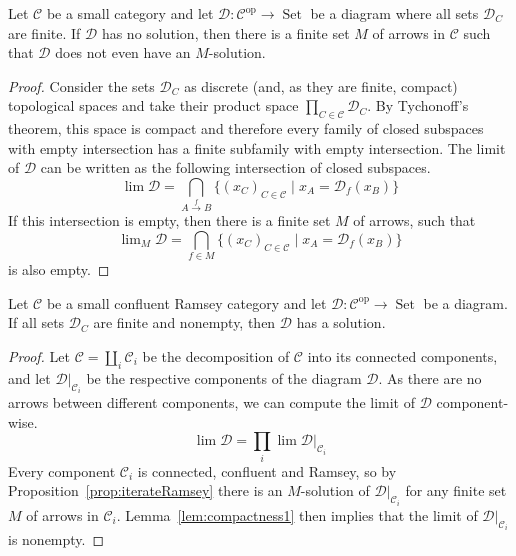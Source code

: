 \documentclass[preprint,12pt]{elsarticle}
\newcommand{\cat}[1]{\mathcal{#1}}
\newcommand{\op}{^{\mathop{op}}}
\DeclareMathOperator{\Set}{Set}
\begin{document}
\begin{lem}[Compactness]
\label{lem:compactness1}
 Let $\cat C$ be a small category and let $\cat D : \cat C \op\to \Set$ be a diagram where all sets $\cat D_C$ are finite. If $\cat D$ has no solution, then there is a finite set $M$ of arrows in $\cat C$ such that $\cat D$ does not even have an $M$-solution.
\end{lem}

\begin{proof}
     Consider the sets $\cat D_C$ as discrete (and, as they are finite, compact) topological spaces and take their product space
    $
    \prod_{C\in \cat C} \cat D_C
    $.
    By Tychonoff's theorem, this space is compact and therefore every family of closed subspaces with empty intersection has a finite subfamily with empty intersection. 
    The limit of $\cat D$ can be written as the following intersection of closed subspaces.
    $$
    \lim \cat D = 
    \bigcap_{A\xrightarrow{f} B}
    \{(x_C)_{C\in \cat C} \mid x_A = \cat D_f(x_{B}) \}
    $$
    If this intersection is empty, then there is a finite set $M$ of arrows, such that 
    $$
    \lim\nolimits_M\cat D = \bigcap_{f\in M} \{(x_C)_{C\in \cat C} \mid x_A = \cat D_f(x_{B}) \}
    $$
    is also empty.
\end{proof}

\begin{cor}
\label{cor:compactRamsey}
    Let $\cat C$ be a small confluent Ramsey category and let $\cat D:\cat C\op\to \Set$ be a diagram. If all sets $\cat D_C$ are finite and nonempty, then $\cat D$ has a solution.
\end{cor}

\begin{proof}
    Let $\cat C = \coprod_i \cat C_i$ be the decomposition of $\cat C$ into its connected components, and let $\cat D|_{\cat C_i}$ be the respective components of the diagram $\cat D$. As there are no arrows between different components, we can compute the limit of $\cat D$ component-wise.
    $$
    \lim\cat D = \prod_i \lim\cat D|_{\cat C_i}
    $$
    Every component $\cat C_i$ is connected, confluent and Ramsey, so by Proposition~\ref{prop:iterateRamsey} there is an $M$-solution of $\cat D|_{\cat C_i}$ for any finite set $M$ of arrows in $\cat C_i$.  Lemma~\ref{lem:compactness1} then implies that the limit of $\cat D|_{\cat C_i}$ is nonempty.
\end{proof}
\end{document}
